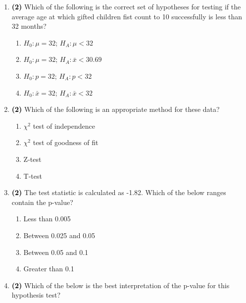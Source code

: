 \documentclass[11pt]{article}
\newcommand{\solnMult}[1]{ #1 }	%
\newcommand{\pts}[1]{ \textbf{{\footnotesize \textcolor{black}{(#1)}}} }	%
\begin{document}
\begin{enumerate}
\item \pts{2} \label{countF} Which of the following is the correct set of hypotheses for testing if the average age at which gifted children fist count to 10 successfully is less than 32 months?

\begin{multicols}{2}
\begin{enumerate}
\item \solnMult{$H_0: \mu = 32$; $H_A: \mu < 32$}
\item $H_0: \mu = 32$; $H_A: \bar{x} < 30.69$
\item $H_0: p = 32$; $H_A: p < 32$
\item $H_0: \bar{x} = 32$; $H_A: \bar{x} < 32$
\end{enumerate}
\end{multicols}

\item \pts{2} Which of the following is an appropriate method for these data?

\begin{multicols}{2}
\begin{enumerate}
\item $\chi^2$ test of independence
\item $\chi^2$ test of goodness of fit
\item \solnMult{Z-test}
\item {T-test}
\end{enumerate}
\end{multicols}

\item \pts{2} The test statistic is calculated as -1.82. Which of the below ranges contain the p-value?

\begin{multicols}{2}
\begin{enumerate}
\item Less than 0.005
\item \solnMult{Between 0.025 and 0.05}
\item Between 0.05 and 0.1
\item Greater than 0.1
\end{enumerate}
\end{multicols}

\item \pts{2}  \label{countL} Which of the below is the best interpretation of the p-value for this hypothesis test?


\end{enumerate}
\end{document}

